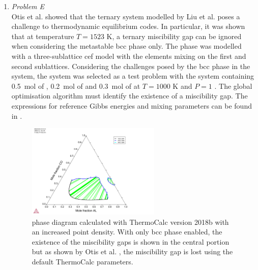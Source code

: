 \begin{enumerate}
	\item	\emph{Problem E}\\
		Otis et al. \cite{Otis:2017ab} showed that  the  ternary system modelled by Liu et al. \cite{Liu:2015aa} poses a challenge to thermodynamic equilibrium codes. In particular, it was shown that at temperature $T = 1523$  \si{\kelvin}, a ternary miscibility gap can be ignored when considering the metastable \gls{bcc} phase only. The phase was modelled with a three-sublattice \gls{cef} model with the elements mixing on the first and second sublattices. Considering the challenges posed by the \gls{bcc} phase in the system, the system was selected as a test problem with the system containing \SI{0.5}{\mole} of , \SI{0.2}{\mole} of  and \SI{0.3}{\mole} of  at $T = 1000$ \si{\kelvin} and $P=1$ \si{\atmosphere}. The global optimisation algorithm must identify the existence of a miscibility gap. The expressions for reference Gibbs energies and mixing parameters can be found in \cite{Liu:2015aa}.
		\begin{figure}[htbp]
			\centering
			\includegraphics[width=0.6\textwidth]{figures/chapter-6/System_AlCoCr.pdf}
			\caption[Global optimisation test problem E: BCC phase  ternary system with the miscibility gap.]{ phase diagram calculated with ThermoCalc version 2018b with an increased point density. With only \gls{bcc} phase enabled, the existence of the miscibility gaps is shown in the central portion but as shown by Otis et al. \cite{Otis:2017ab}, the miscibility gap is lost using the default ThermoCalc parameters.}
			\label{fig:testE}
		\end{figure} 
	

\end{enumerate}
